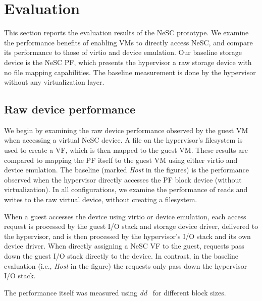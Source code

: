 \chapter{Evaluation}
\label{chap:eval}



This section reports the evaluation results of the NeSC prototype.
We examine the performance benefits of enabling VMs to directly access NeSC, and compare its performance to those of virtio and device emulation.
Our baseline storage device is the NeSC PF, which presents the hypervisor a raw storage device with no file mapping capabilities. The baseline measurement is done by the hypervisor without any virtualization layer.

\section*{Raw device performance}

We begin by examining the raw device performance observed by the guest VM when accessing a virtual NeSC device. A file on the hypervisor's filesystem is used to create a VF, which is then mapped to the guest VM. These results are compared to mapping the PF itself to the guest VM using either virtio and device emulation. The baseline (marked \emph{Host} in the figures) is the performance observed when the hypervisor directly accesses the PF block device (without virtualization).
In all configurations, we examine the performance of reads and writes to the raw virtual device, without creating a filesystem. 

When a guest accesses the device using virtio or device emulation, each access  request is processed by the guest I/O stack and storage device driver, delivered to the hypervisor, and is then processed by the hypervisor's I/O stack and its own device driver.
When directly assigning a NeSC VF to the guest, requests pass down the guest I/O stack directly to the device. In contrast, in the baseline evaluation (i.e., \emph{Host} in the figure) the requests only pass down the hypervisor I/O stack.

The performance itself was measured using \emph{dd}~\cite{coreutils} for different block sizes.

